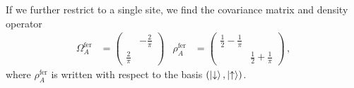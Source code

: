 \documentclass[prl,a4paper,notitlepage,twocolumn,superscriptaddress,longbibliography,reprint]{revtex4-2}
\begin{document}
If we further restrict to a single site, we find the covariance matrix and density operator
\begin{align}
    \Omega^{\mathrm{fer}}_{A} &= 
    \begin{pmatrix}
      & -\frac{2}{\pi }  \\
     \frac{2}{\pi } &
    \end{pmatrix} & \rho_A^{\mathrm{fer}} &= 
    \begin{pmatrix}
     \frac{1}{2}-\frac{1}{\pi} & \\
      & \frac{1}{2}+\frac{1}{\pi}
    \end{pmatrix}\,,
\end{align}
where $\rho_A^{\mathrm{fer}}$ is written with respect to the basis $(\ket{\downarrow},\ket{\uparrow})$.
\end{document}
